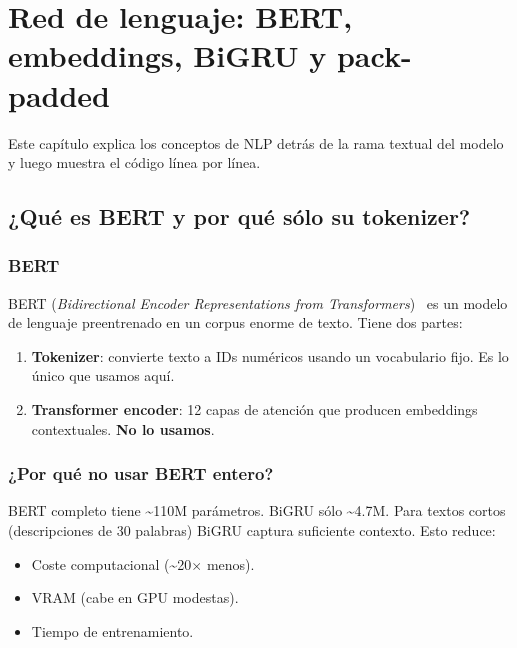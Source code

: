 \chapter{Red de lenguaje: BERT, embeddings, BiGRU y pack-padded}
\label{cap:language-network}

Este capítulo explica los conceptos de NLP detrás de la rama
textual del modelo y luego muestra el código línea por línea.

\section{¿Qué es BERT y por qué sólo su tokenizer?}

\subsection{BERT}

BERT (\emph{Bidirectional Encoder Representations from
Transformers})~\cite{devlin2018bert} es un modelo de lenguaje
preentrenado en un corpus enorme de texto. Tiene dos partes:

\begin{enumerate}
  \item \textbf{Tokenizer}: convierte texto a IDs numéricos usando
        un vocabulario fijo. Es lo único que usamos aquí.
  \item \textbf{Transformer encoder}: 12 capas de atención que
        producen embeddings contextuales. \textbf{No lo usamos}.
\end{enumerate}

\subsection{¿Por qué no usar BERT entero?}

BERT completo tiene \textasciitilde 110M parámetros. BiGRU sólo
\textasciitilde 4.7M. Para textos cortos (descripciones de 30
palabras) BiGRU captura suficiente contexto. Esto reduce:

\begin{itemize}
  \item Coste computacional (\textasciitilde 20$\times$ menos).
  \item VRAM (cabe en GPU modestas).
  \item Tiempo de entrenamiento.
\end{itemize}

